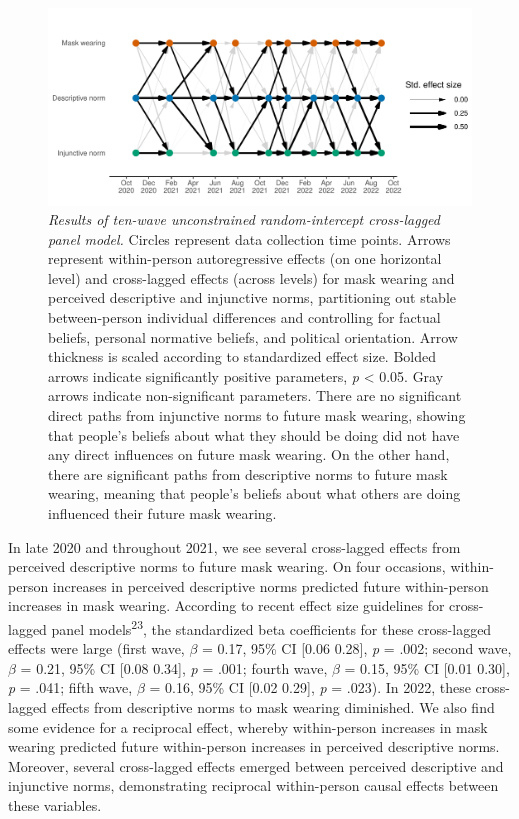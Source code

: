 \documentclass[
  man, donotrepeattitle,floatsintext]{apa6}
\begin{document}
\begin{figure}
\centering
\includegraphics{manuscript_files/figure-latex/plotRICLPM-1.pdf}
\caption{\label{fig:plotRICLPM}\emph{Results of ten-wave unconstrained random-intercept cross-lagged panel model.} Circles represent data collection time points. Arrows represent within-person autoregressive effects (on one horizontal level) and cross-lagged effects (across levels) for mask wearing and perceived descriptive and injunctive norms, partitioning out stable between-person individual differences and controlling for factual beliefs, personal normative beliefs, and political orientation. Arrow thickness is scaled according to standardized effect size. Bolded arrows indicate significantly positive parameters, \emph{p} \textless{} 0.05. Gray arrows indicate non-significant parameters. There are no significant direct paths from injunctive norms to future mask wearing, showing that people's beliefs about what they should be doing did not have any direct influences on future mask wearing. On the other hand, there are significant paths from descriptive norms to future mask wearing, meaning that people's beliefs about what others are doing influenced their future mask wearing.}
\end{figure}

In late 2020 and throughout 2021, we see several cross-lagged effects from perceived descriptive norms to future mask wearing. On four occasions, within-person increases in perceived descriptive norms predicted future within-person increases in mask wearing. According to recent effect size guidelines for cross-lagged panel models\textsuperscript{23}, the standardized beta coefficients for these cross-lagged effects were large (first wave, \(\beta\) = 0.17, 95\% CI {[}0.06 0.28{]}, \emph{p} = .002; second wave, \(\beta\) = 0.21, 95\% CI {[}0.08 0.34{]}, \emph{p} = .001; fourth wave, \(\beta\) = 0.15, 95\% CI {[}0.01 0.30{]}, \emph{p} = .041; fifth wave, \(\beta\) = 0.16, 95\% CI {[}0.02 0.29{]}, \emph{p} = .023). In 2022, these cross-lagged effects from descriptive norms to mask wearing diminished. We also find some evidence for a reciprocal effect, whereby within-person increases in mask wearing predicted future within-person increases in perceived descriptive norms. Moreover, several cross-lagged effects emerged between perceived descriptive and injunctive norms, demonstrating reciprocal within-person causal effects between these variables.
\end{document}
